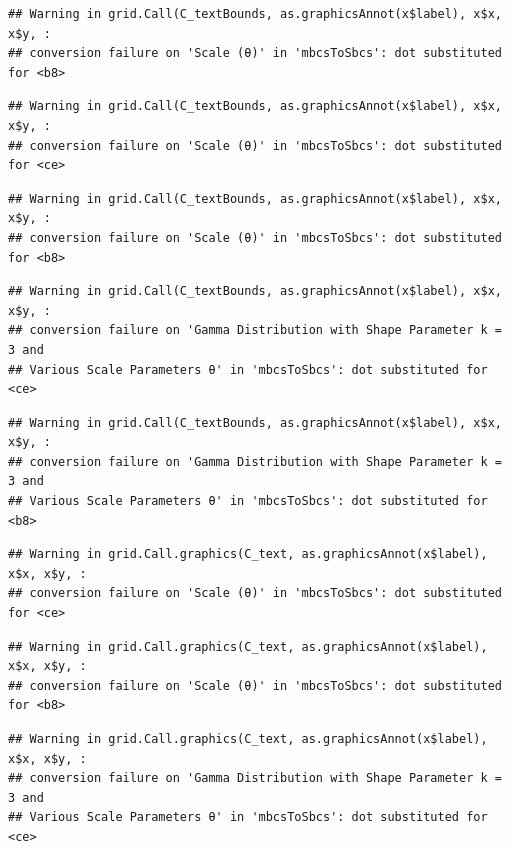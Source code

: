 \documentclass[
]{article}
\begin{document}
\begin{verbatim}
## Warning in grid.Call(C_textBounds, as.graphicsAnnot(x$label), x$x, x$y, :
## conversion failure on 'Scale (θ)' in 'mbcsToSbcs': dot substituted for <b8>
\end{verbatim}

\begin{verbatim}
## Warning in grid.Call(C_textBounds, as.graphicsAnnot(x$label), x$x, x$y, :
## conversion failure on 'Scale (θ)' in 'mbcsToSbcs': dot substituted for <ce>
\end{verbatim}

\begin{verbatim}
## Warning in grid.Call(C_textBounds, as.graphicsAnnot(x$label), x$x, x$y, :
## conversion failure on 'Scale (θ)' in 'mbcsToSbcs': dot substituted for <b8>
\end{verbatim}

\begin{verbatim}
## Warning in grid.Call(C_textBounds, as.graphicsAnnot(x$label), x$x, x$y, :
## conversion failure on 'Gamma Distribution with Shape Parameter k = 3 and
## Various Scale Parameters θ' in 'mbcsToSbcs': dot substituted for <ce>
\end{verbatim}

\begin{verbatim}
## Warning in grid.Call(C_textBounds, as.graphicsAnnot(x$label), x$x, x$y, :
## conversion failure on 'Gamma Distribution with Shape Parameter k = 3 and
## Various Scale Parameters θ' in 'mbcsToSbcs': dot substituted for <b8>
\end{verbatim}

\begin{verbatim}
## Warning in grid.Call.graphics(C_text, as.graphicsAnnot(x$label), x$x, x$y, :
## conversion failure on 'Scale (θ)' in 'mbcsToSbcs': dot substituted for <ce>
\end{verbatim}

\begin{verbatim}
## Warning in grid.Call.graphics(C_text, as.graphicsAnnot(x$label), x$x, x$y, :
## conversion failure on 'Scale (θ)' in 'mbcsToSbcs': dot substituted for <b8>
\end{verbatim}

\begin{verbatim}
## Warning in grid.Call.graphics(C_text, as.graphicsAnnot(x$label), x$x, x$y, :
## conversion failure on 'Gamma Distribution with Shape Parameter k = 3 and
## Various Scale Parameters θ' in 'mbcsToSbcs': dot substituted for <ce>
\end{verbatim}
\end{document}
